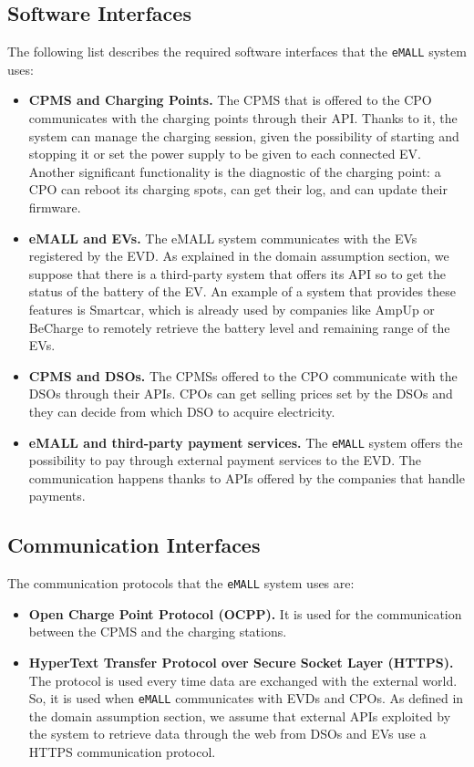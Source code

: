 \subsection{Software Interfaces}
\label{subsec:software_interfaces}%
The following list describes the required software interfaces that the \verb|eMALL| system uses:
\begin{itemize}
    \item \textbf{CPMS and Charging Points.} The CPMS that is offered to the CPO communicates with the charging points
    through their API\@.
    Thanks to it, the system can manage the charging session, given the possibility of starting and stopping it or set
    the power supply to be given to each connected EV\@.
    Another significant functionality is the diagnostic of the charging point:
    a CPO can reboot its charging spots, can get their log, and can update their firmware.
    \item \textbf{eMALL and EVs.} The eMALL system communicates with the EVs registered by the EVD\@.
    As explained in the domain assumption section, we suppose that there is a third-party system that offers its API
    so to get the status of the battery of the EV\@.
    An example of a system that provides these features is Smartcar,
    which is already used by companies like AmpUp or BeCharge to remotely retrieve the battery level and remaining range of the EVs.
    \item \textbf{CPMS and DSOs.} The CPMSs offered to the CPO communicate with the DSOs through their APIs.
    CPOs can get selling prices set by the DSOs and they can decide from which DSO to acquire electricity.
    \item \textbf{eMALL and third-party payment services.} The \verb|eMALL| system offers the possibility to pay through
    external payment services to the EVD. The communication happens thanks to APIs offered by the companies that handle payments.
\end{itemize}

\subsection{Communication Interfaces}
\label{subsec:communication_interfaces}%
The communication protocols that the \verb|eMALL| system uses are:
\begin{itemize}
    \item \textbf{Open Charge Point Protocol (OCPP).} It is used for the communication between the CPMS and the charging
    stations.
    \item \textbf{HyperText Transfer Protocol over Secure Socket Layer (HTTPS).} The protocol is used every time data are
    exchanged with the external world.
    So, it is used when \verb|eMALL| communicates with EVDs and CPOs.
    As defined in the domain assumption section, we assume that external APIs exploited by the system to retrieve data
    through the web from DSOs and EVs use a HTTPS communication protocol.
\end{itemize}


